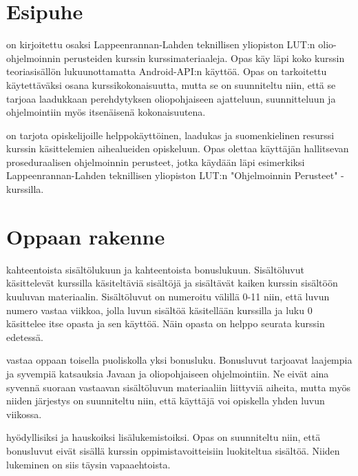 \documentclass{tufte-book}
\newcommand{\lutin}{Lappeenrannan-Lahden teknillisen yliopiston LUT:n }
\begin{document}

\section{Esipuhe}
\label{esipuhe}

 on kirjoitettu osaksi \lutin olio-ohjelmoinnin perusteiden kurssin
kurssimateriaaleja. Opas käy läpi koko kurssin  teoriasisällön lukuunottamatta Android-API:n
käyttöä. Opas on tarkoitettu käytettäväksi osana kurssikokonaisuutta, mutta se on suunniteltu
niin, että se tarjoaa laadukkaan perehdytyksen oliopohjaiseen ajatteluun, suunnitteluun ja
ohjelmointiin myös itsenäisenä kokonaisuutena.

 on tarjota opiskelijoille helppokäyttöinen,
laadukas ja suomenkielinen resurssi kurssin käsittelemien aihealueiden
opiskeluun. Opas olettaa käyttäjän hallitsevan proseduraalisen ohjelmoinnin
perusteet, jotka käydään läpi esimerkiksi \lutin "Ohjelmoinnin Perusteet" 
-kurssilla.


\section{Oppaan rakenne}
\label{rakenteesta}

 kahteentoista sisältölukuun ja kahteentoista bonuslukuun. Sisältöluvut
käsittelevät kurssilla käsiteltäviä sisältöjä ja sisältävät kaiken kurssin sisältöön kuuluvan
materiaalin. Sisältöluvut on numeroitu välillä 0-11 niin, että luvun numero vastaa viikkoa, jolla
luvun sisältöä käsitellään kurssilla ja luku 0 käsittelee itse opasta ja sen käyttöä. Näin opasta
on helppo seurata kurssin edetessä.

 vastaa oppaan toisella puoliskolla yksi bonusluku. Bonusluvut
tarjoavat laajempia ja syvempiä katsauksia Javaan ja oliopohjaiseen ohjelmointiin. Ne eivät aina
syvennä suoraan vastaavan sisältöluvun materiaaliin liittyviä aiheita, mutta myös niiden järjestys
on suunniteltu niin, että käyttäjä voi opiskella yhden luvun viikossa.

 hyödyllisiksi ja hauskoiksi lisälukemistoiksi. Opas on
suunniteltu niin, että bonusluvut eivät sisällä kurssin oppimistavoitteisiin luokiteltua sisältöä.
Niiden lukeminen on siis täysin vapaaehtoista.
\end{document}
